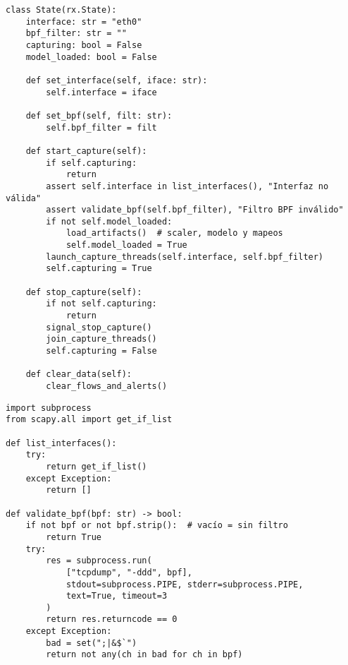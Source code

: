 \begin{lstlisting}[style=tfgpython,caption={Estado mínimo para configuración y captura},label=List.ConfigState]
class State(rx.State):
    interface: str = "eth0"
    bpf_filter: str = ""
    capturing: bool = False
    model_loaded: bool = False

    def set_interface(self, iface: str):
        self.interface = iface

    def set_bpf(self, filt: str):
        self.bpf_filter = filt

    def start_capture(self):
        if self.capturing:
            return
        assert self.interface in list_interfaces(), "Interfaz no válida"
        assert validate_bpf(self.bpf_filter), "Filtro BPF inválido"
        if not self.model_loaded:
            load_artifacts()  # scaler, modelo y mapeos
            self.model_loaded = True
        launch_capture_threads(self.interface, self.bpf_filter)
        self.capturing = True

    def stop_capture(self):
        if not self.capturing:
            return
        signal_stop_capture()
        join_capture_threads()
        self.capturing = False

    def clear_data(self):
        clear_flows_and_alerts()
\end{lstlisting}

\begin{lstlisting}[style=tfgpython,caption={Utilidades: listar interfaces y validar filtros BPF},label=List.ConfigUtils]
import subprocess
from scapy.all import get_if_list

def list_interfaces():
    try:
        return get_if_list()
    except Exception:
        return []

def validate_bpf(bpf: str) -> bool:
    if not bpf or not bpf.strip():  # vacío = sin filtro
        return True
    try:
        res = subprocess.run(
            ["tcpdump", "-ddd", bpf],
            stdout=subprocess.PIPE, stderr=subprocess.PIPE,
            text=True, timeout=3
        )
        return res.returncode == 0
    except Exception:
        bad = set(";|&$`")
        return not any(ch in bad for ch in bpf)
\end{lstlisting}


